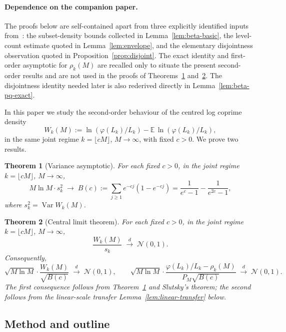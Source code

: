 \documentclass[11pt]{article}
\newtheorem{theorem}{Theorem}
\theoremstyle{remark}
\newcommand{\EE}{\mathbb{E}}
\newcommand{\NN}{\mathcal{N}}
\DeclareMathOperator{\Var}{Var}
\begin{document}
\paragraph{Dependence on the companion paper.}
The proofs below are self-contained apart from three explicitly identified inputs from~\cite{wakid1}: the subset-density bounds collected in Lemma~\ref{lem:beta-basic}, the level-count estimate quoted in Lemma~\ref{lem:envelope}, and the elementary disjointness observation quoted in Proposition~\ref{prop:disjoint}. The exact identity and first-order asymptotic for $\rho_k(M)$ are recalled only to situate the present second-order results and are not used in the proofs of Theorems~\ref{thm:variance} and~\ref{thm:CLT}. The disjointness identity needed later is also rederived directly in Lemma~\ref{lem:beta-pq-exact}.

In this paper we study the second-order behaviour of the centred log coprime density
\[
W_k(M) := \ln(\varphi(L_k)/L_k) - \EE\,\ln(\varphi(L_k)/L_k),
\]
in the same joint regime $k = \lfloor cM \rfloor$, $M \to \infty$, with fixed $c > 0$. We prove two results.

\begin{theorem}[Variance asymptotic]\label{thm:variance}
For each fixed $c > 0$, in the joint regime $k = \lfloor cM \rfloor$, $M \to \infty$,
\begin{equation}\label{eq:variance-limit}
M \ln M \cdot s_k^2 \;\longrightarrow\; B(c) := \sum_{j \geq 1} e^{-cj}(1 - e^{-cj}) = \frac{1}{e^c - 1} - \frac{1}{e^{2c} - 1},
\end{equation}
where $s_k^2 = \Var W_k(M)$.
\end{theorem}

\begin{theorem}[Central limit theorem]\label{thm:CLT}
For each fixed $c > 0$, in the joint regime $k = \lfloor cM \rfloor$, $M \to \infty$,
\[
\frac{W_k(M)}{s_k} \;\xrightarrow{d}\; \NN(0, 1).
\]
Consequently,
\[
\sqrt{M \ln M} \cdot \frac{W_k(M)}{\sqrt{B(c)}} \;\xrightarrow{d}\; \NN(0, 1),
\qquad
\sqrt{M \ln M} \cdot \frac{\varphi(L_k)/L_k - \rho_k(M)}{P_M \sqrt{B(c)}} \;\xrightarrow{d}\; \NN(0, 1).
\]
The first consequence follows from Theorem~\ref{thm:variance} and Slutsky's theorem; the second follows from the linear-scale transfer Lemma~\ref{lem:linear-transfer} below.
\end{theorem}

\subsection{Method and outline}
\end{document}
